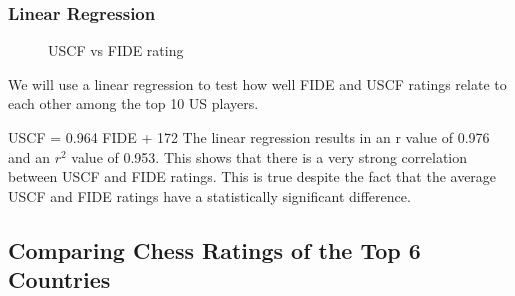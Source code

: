 \documentclass[12pt, titlepage]{article}
\begin{document}
\subsubsection{Linear Regression}
\begin{figure}[H]
\centering
{}
    \caption{USCF vs FIDE rating}
\end{figure}

We will use a linear regression to test how well FIDE and USCF ratings relate to each other among the top 10 US players.

USCF = 0.964 FIDE + 172
The linear regression results in an r value of 0.976 and an \(r^{2}\) value of 0.953. This shows that there is a very strong correlation between USCF and FIDE ratings. This is true despite the fact that the average USCF and FIDE ratings have a statistically significant difference.


\subsection{Comparing Chess Ratings of the Top 6 Countries}
\end{document}
